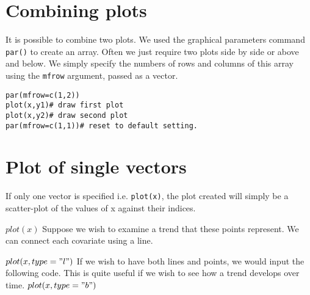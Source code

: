 \section{Combining plots}
It is possible to combine two plots. We used the graphical parameters command \texttt{par()} to create an array.
Often we just require two plots side by side or above and below. We simply specify the numbers of rows and columns of this array using the \texttt{mfrow} argument, passed as a vector.

\begin{verbatim}
par(mfrow=c(1,2))
plot(x,y1)# draw first plot
plot(x,y2)# draw second plot
par(mfrow=c(1,1))# reset to default setting.
\end{verbatim}




\section{Plot of single vectors}
If only one vector is specified i.e. \texttt{plot(x)},  the plot created will simply be a scatter-plot of the values of x against their indices.

$plot(x)$
Suppose we wish to examine a trend that these points represent. We can connect each covariate using a line.

$plot(x, type = "l")$
If we wish to have both lines and points, we would input the following code. This is quite useful if we wish to see how a trend develops over time.
$plot(x, type = "b")$


